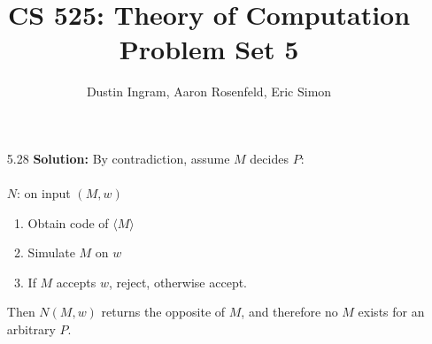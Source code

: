 \documentclass{article}
\title{CS 525: Theory of Computation\\ Problem Set 5}
\author{Dustin Ingram, Aaron Rosenfeld, Eric Simon}
\begin{document}
\maketitle
\begin{enumerate}
    \item[5.28] \textbf{Solution:}
    By contradiction, assume $M$ decides $P$: \\ \\
    $N$: on input $(M, w)$
    \begin{enumerate}
        \item Obtain code of $\langle M \rangle$
        \item Simulate $M$ on $w$
        \item If $M$ accepts $w$, reject, otherwise accept.
    \end{enumerate}
    Then $N(M,w)$ returns the opposite of $M$, and therefore no $M$ exists for an arbitrary $P$.
\end{enumerate}
\end{document}
